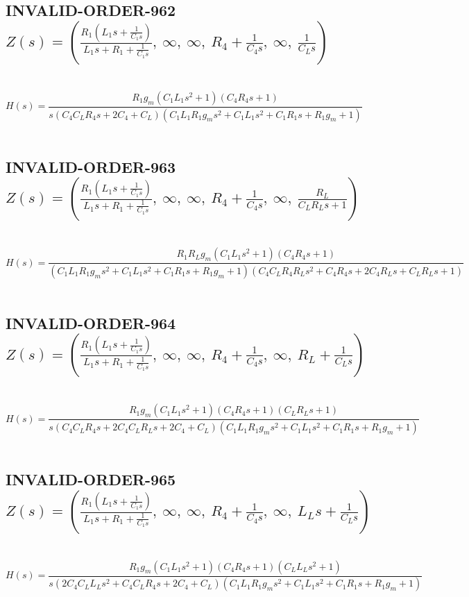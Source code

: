 \documentclass{article}
\begin{document}
\subsection{INVALID-ORDER-962 $Z(s) = \left( \frac{R_{1} \left(L_{1} s + \frac{1}{C_{1} s}\right)}{L_{1} s + R_{1} + \frac{1}{C_{1} s}}, \  \infty, \  \infty, \  R_{4} + \frac{1}{C_{4} s}, \  \infty, \  \frac{1}{C_{L} s}\right)$ } \ 
\textbf{\[H(s) = \frac{R_{1} g_{m} \left(C_{1} L_{1} s^{2} + 1\right) \left(C_{4} R_{4} s + 1\right)}{s \left(C_{4} C_{L} R_{4} s + 2 C_{4} + C_{L}\right) \left(C_{1} L_{1} R_{1} g_{m} s^{2} + C_{1} L_{1} s^{2} + C_{1} R_{1} s + R_{1} g_{m} + 1\right)}\] } \ 
\subsection{INVALID-ORDER-963 $Z(s) = \left( \frac{R_{1} \left(L_{1} s + \frac{1}{C_{1} s}\right)}{L_{1} s + R_{1} + \frac{1}{C_{1} s}}, \  \infty, \  \infty, \  R_{4} + \frac{1}{C_{4} s}, \  \infty, \  \frac{R_{L}}{C_{L} R_{L} s + 1}\right)$ } \ 
\textbf{\[H(s) = \frac{R_{1} R_{L} g_{m} \left(C_{1} L_{1} s^{2} + 1\right) \left(C_{4} R_{4} s + 1\right)}{\left(C_{1} L_{1} R_{1} g_{m} s^{2} + C_{1} L_{1} s^{2} + C_{1} R_{1} s + R_{1} g_{m} + 1\right) \left(C_{4} C_{L} R_{4} R_{L} s^{2} + C_{4} R_{4} s + 2 C_{4} R_{L} s + C_{L} R_{L} s + 1\right)}\] } \ 
\subsection{INVALID-ORDER-964 $Z(s) = \left( \frac{R_{1} \left(L_{1} s + \frac{1}{C_{1} s}\right)}{L_{1} s + R_{1} + \frac{1}{C_{1} s}}, \  \infty, \  \infty, \  R_{4} + \frac{1}{C_{4} s}, \  \infty, \  R_{L} + \frac{1}{C_{L} s}\right)$ } \ 
\textbf{\[H(s) = \frac{R_{1} g_{m} \left(C_{1} L_{1} s^{2} + 1\right) \left(C_{4} R_{4} s + 1\right) \left(C_{L} R_{L} s + 1\right)}{s \left(C_{4} C_{L} R_{4} s + 2 C_{4} C_{L} R_{L} s + 2 C_{4} + C_{L}\right) \left(C_{1} L_{1} R_{1} g_{m} s^{2} + C_{1} L_{1} s^{2} + C_{1} R_{1} s + R_{1} g_{m} + 1\right)}\] } \ 
\subsection{INVALID-ORDER-965 $Z(s) = \left( \frac{R_{1} \left(L_{1} s + \frac{1}{C_{1} s}\right)}{L_{1} s + R_{1} + \frac{1}{C_{1} s}}, \  \infty, \  \infty, \  R_{4} + \frac{1}{C_{4} s}, \  \infty, \  L_{L} s + \frac{1}{C_{L} s}\right)$ } \ 
\textbf{\[H(s) = \frac{R_{1} g_{m} \left(C_{1} L_{1} s^{2} + 1\right) \left(C_{4} R_{4} s + 1\right) \left(C_{L} L_{L} s^{2} + 1\right)}{s \left(2 C_{4} C_{L} L_{L} s^{2} + C_{4} C_{L} R_{4} s + 2 C_{4} + C_{L}\right) \left(C_{1} L_{1} R_{1} g_{m} s^{2} + C_{1} L_{1} s^{2} + C_{1} R_{1} s + R_{1} g_{m} + 1\right)}\] } \ 
\end{document}
